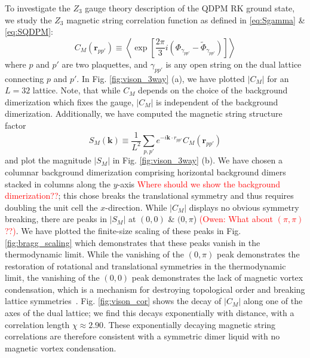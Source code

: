 \documentclass[twocolumn,prb,aps,floatfix,superscriptaddress]{revtex4-1}
\newcommand{\figref}[1]{Fig. \ref{#1}}
\newcommand{\note}[1]{\textcolor{red}{#1}}
\begin{document}
To investigate the $Z_3$ gauge theory description of the QDPM RK ground state, we study the $Z_3$ magnetic string correlation function as defined in \eqref{eq:Sgamma} \& \eqref{eq:SQDPM}:
\begin{equation}
C_M \left( \bm{r}_{pp'} \right) \equiv \left \langle \exp \left[ \frac{2 \pi}{3} i \left( \Phi_{\gamma_{pp'}} -\tilde{\Phi}_{\gamma_{pp'}} \right) \right] \right \rangle
\end{equation}
where $p$ and $p'$ are two plaquettes, and $\gamma_{pp'}$ is any open string on the dual lattice
connecting $p$ and $p'$. In \figref{fig:vison_3way} (a), we have plotted $|C_M|$ for an $L=32$ lattice. Note, that while $C_M$ depends on the choice of the background dimerization which fixes the gauge, $|C_M|$ is independent of the background dimerization. Additionally, we have computed the magnetic string structure factor
\begin{equation}
S_M\left( \bm{k} \right) \equiv \frac{1}{ L^2} \sum_{p,p'} e^{-i \bm{k} \cdot r_{pp'}} C_M\left( \bm{r}_{pp'}\right)
\end{equation}
and plot the magnitude $|S_M|$ in \figref{fig:vison_3way} (b). We have chosen a columnar background dimerization comprising horizontal background dimers stacked in columns along the $y$-axis
\note{Where should we show the background dimerization??}; this chose breaks the translational symmetry and thus requires doubling the unit cell the $x$-direction. While $|C_M|$ displays no obvious symmetry breaking, there are peaks in $|S_M|$ at $(0,0)$ \& $(0,\pi$) \note{(Owen: What about $(\pi,\pi)$??)}. We have plotted the finite-size scaling of these peaks in \figref{fig:bragg_scaling} which demonstrates that these peaks vanish in the thermodynamic limit.  While the vanishing of the $(0,\pi)$ peak demonstrates the restoration of rotational and translational symmetries in the thermodynamic limit, the vanishing of the $(0,0)$ peak demonstrates the lack of magnetic vortex condensation, which is a mechanism for destroying topological order and breaking lattice symmetries~\cite{Jalabert1991,Ralko2007,Huh2011}. \figref{fig:vison_cor} shows the decay of $|C_M|$ along one of the axes of the dual lattice; we find this decays exponentially with distance, with a correlation length $\chi\approx 2.90$. These exponentially decaying magnetic string correlations are therefore consistent with a symmetric dimer liquid with no magnetic vortex condensation.
\end{document}
